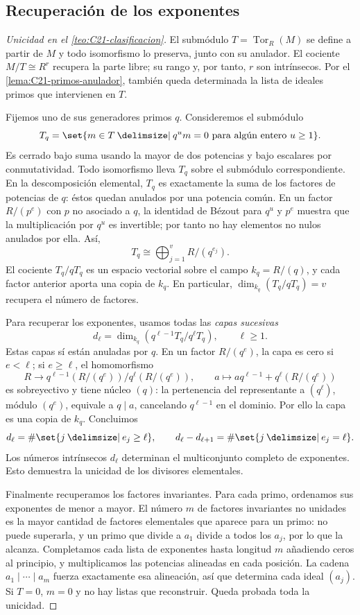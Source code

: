 \subsection{Recuperación de los exponentes}\label{tema:21-3-2}
\begin{proof}[Unicidad en el \cref{teo:C21-clasificacion}]
El submódulo $T=\operatorname{Tor}_R(M)$ se define a partir de $M$ y todo isomorfismo lo preserva, junto con su anulador. El cociente $M/T\cong R^r$ recupera la parte libre; su rango y, por tanto, $r$ son intrínsecos. Por el \cref{lema:C21-primos-anulador}, también queda determinada la lista de ideales primos que intervienen en $T$.

Fijemos uno de sus generadores primos $q$. Consideremos el submódulo
\[
T_q=\set{m\in T\given q^um=0\text{ para algún entero }u\geq1}.
\]
Es cerrado bajo suma usando la mayor de dos potencias y bajo escalares por conmutatividad. Todo isomorfismo lleva $T_q$ sobre el submódulo correspondiente. En la descomposición elemental, $T_q$ es exactamente la suma de los factores de potencias de $q$: éstos quedan anulados por una potencia común. En un factor $R/(p^e)$ con $p$ no asociado a $q$, la identidad de Bézout para $q^u$ y $p^e$ muestra que la multiplicación por $q^u$ es invertible; por tanto no hay elementos no nulos anulados por ella. Así,
\[
T_q\cong\bigoplus_{j=1}^{v}R/(q^{e_j}).
\]
El cociente $T_q/qT_q$ es un espacio vectorial sobre el campo $k_q=R/(q)$, y cada factor anterior aporta una copia de $k_q$. En particular, $\dim_{k_q}(T_q/qT_q)=v$ recupera el número de factores.

Para recuperar los exponentes, usamos todas las \emph{capas sucesivas}
\[
d_\ell=\dim_{k_q}\left(q^{\ell-1}T_q/q^\ell T_q\right),
\qquad \ell\geq1.
\]
Estas capas sí están anuladas por $q$. En un factor $R/(q^e)$, la capa es cero si $e<\ell$; si $e\geq\ell$, el homomorfismo
\[
R\longrightarrow q^{\ell-1}(R/(q^e))/q^\ell(R/(q^e)),
\qquad a\longmapsto aq^{\ell-1}+q^\ell(R/(q^e))
\]
es sobreyectivo y tiene núcleo $(q)$: la pertenencia del representante a $(q^\ell)$, módulo $(q^e)$, equivale a $q\mid a$, cancelando $q^{\ell-1}$ en el dominio. Por ello la capa es una copia de $k_q$. Concluimos
\[
d_\ell=\#\set{j\given e_j\geq\ell},\qquad
d_\ell-d_{\ell+1}=\#\set{j\given e_j=\ell}.
\]
Los números intrínsecos $d_\ell$ determinan el multiconjunto completo de exponentes. Esto demuestra la unicidad de los divisores elementales.

Finalmente recuperamos los factores invariantes. Para cada primo, ordenamos sus exponentes de menor a mayor. El número $m$ de factores invariantes no unidades es la mayor cantidad de factores elementales que aparece para un primo: no puede superarla, y un primo que divide a $a_1$ divide a todos los $a_j$, por lo que la alcanza. Completamos cada lista de exponentes hasta longitud $m$ añadiendo ceros al principio, y multiplicamos las potencias alineadas en cada posición. La cadena $a_1\mid\cdots\mid a_m$ fuerza exactamente esa alineación, así que determina cada ideal $(a_j)$. Si $T=0$, $m=0$ y no hay listas que reconstruir. Queda probada toda la unicidad.
\end{proof}

